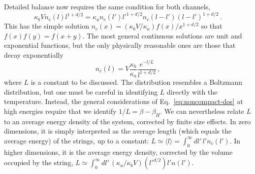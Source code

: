\documentclass[a4paper,11pt]{article}
\begin{document}
Detailed balance now requires the same condition for both channels,
\begin{equation}
    \kappa_b V n_c(l)l^{1+d/2}=\kappa_a n_c(l')l'^{1+d/2}n_c(l-l')(l-l')^{1+d/2}\, .
\end{equation}
This has the simple solution $n_c(x)=(\kappa_b V/\kappa_a)f(x)/x^{1+d/2}$ so that $f(x)f(y)=f(x+y)$. 
The most general continuous solutions are unit and exponential functions, but the only physically reasonable ones are those that decay exponentially
\begin{equation}\label{eq:eq-dist-closed}
    n_c(l)=V \frac{\kappa_b}{\kappa_a}\frac{e^{-l/L}}{l^{1+d/2}}\, ,
\end{equation}
where $L$ is a constant to be discussed. 
The distribution resembles a Boltzmann distribution, but one must be careful in identifying $L$ directly with the temperature.
Instead, the general considerations of Eq.~\eqref{eq:noncompact-dos} at high energies require that we identify $1/L=\beta-\beta_H$.
We can nevertheless relate $L$ to an average energy density of the system, corrected by finite size effects. 
In zero dimensions, it is simply interpreted as the average length 
(which equals the average energy) of the strings, up to a constant: $L\simeq\langle l \rangle=\int_0^\infty{dl' \, l'n_c(l')}$.
In higher dimensions, it is the average energy density, corrected by the volume occupied by the string, $L\simeq\int_0^\infty{dl'\, (\kappa_a/\kappa_b V) (l'^{d/2}) l'n(l')}$.
\end{document}

